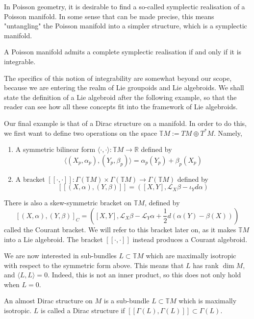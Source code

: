 In Poisson geometry, it is desirable to find a so-called symplectic realisation of a Poisson manifold. In some sense that can be made precise, this means "untangling" the Poisson manifold into a simpler structure, which is a symplectic manifold. 
\begin{theorem}
  A Poisson manifold admits a complete symplectic realisation if and only if it is integrable.
\end{theorem}
The specifics of this notion of integrability are somewhat beyond our scope, because we are entering the realm of Lie groupoids and Lie algebroids. We shall state the definition of a Lie algebroid after the following example, so that the reader can see how all these concepts fit into the framework of Lie algebroids.\par
Our final example is that of a Dirac structure on a manifold. In order to do this, we first want to define two operations on the space $\mathbb{T}M:=TM\oplus T^*M$. Namely, 
\begin{enumerate}
    \item A symmetric bilinear form $\langle\cdot,\cdot\rangle:\mathbb{T}M\to\mathbb{R}$ defined by $$\langle(X_p,\alpha_p),(Y_p,\beta_p)\rangle=\alpha_p(Y_p)+\beta_p(X_p)$$
    \item A bracket  $[\![\cdot,\cdot]\!]:\Gamma(\mathbb{T}M)\times\Gamma(\mathbb{T}M)\to\Gamma(\mathbb{T}M)$ defined by $$[\![(X,\alpha),(Y,\beta)]\!]=([X,Y],\mathcal{L}_X\beta-\iota_Yd\alpha)$$
\end{enumerate}
\begin{remark}
There is also a skew-symmetric bracket on $\mathbb{T}M$, defined by
$$[(X,\alpha),(Y,\beta)]_C=([X,Y],\mathcal{L}_X\beta-\mathcal{L}_Y\alpha+\frac{1}{2}d(\alpha(Y)-\beta(X)))$$
called the Courant bracket. We will refer to this bracket later on, as it makes $\mathbb{T}M$ into a Lie algebroid. The bracket $[\![\cdot,\cdot]\!]$ instead produces a Courant algebroid.
\end{remark}
We are now interested in sub-bundles $L\subset\mathbb{T}M$ which are maximally isotropic with respect to the symmetric form above. This means that $L$ has rank $\dim M$, and $\langle L,L\rangle=0$. Indeed, this is not an inner product, so this does not only hold when $L=0$.
\begin{definition}
An almost Dirac structure on $M$ is a sub-bundle $L\subset\mathbb{T}M$ which is maximally isotropic. $L$ is called a Dirac structure if $[\![\Gamma(L),\Gamma(L)]\!]\subset\Gamma(L)$.
\end{definition}

